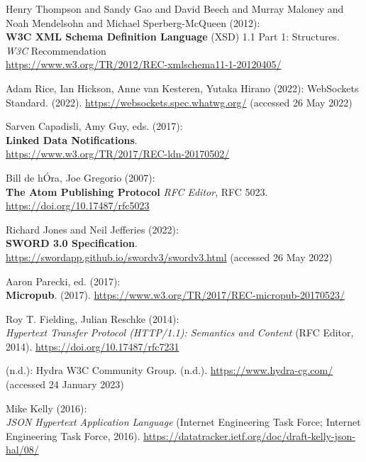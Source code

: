\begin{thebibliography}{9}
Henry Thompson and Sandy Gao and David Beech and Murray Maloney and Noah Mendelsohn and Michael Sperberg-McQueen (2012):\\
\textbf{W3C XML Schema Definition Language} ({XSD}) 1.1 {Part} 1: {Structures}. \\
\emph{W3C} Recommendation\\
\url{https://www.w3.org/TR/2012/REC-xmlschema11-1-20120405/}

Adam Rice, Ian Hickson, Anne van Kesteren, Yutaka Hirano (2022):
{WebSockets Standard}. (2022). \url{https://websockets.spec.whatwg.org/}
(accessed 26 May 2022)

Sarven Capadisli, Amy Guy, eds. (2017): \\
\textbf{Linked Data Notifications}.\\
\url{https://www.w3.org/TR/2017/REC-ldn-20170502/}

Bill de hÓra, Joe Gregorio (2007): \\
\textbf{The {Atom Publishing Protocol}} 
\emph{RFC Editor}, RFC 5023.
\url{https://doi.org/10.17487/rfc5023}

Richard Jones and Neil Jefferies (2022): \\
\textbf{SWORD 3.0 Specification}. \\
\url{https://swordapp.github.io/swordv3/swordv3.html} (accessed 26 May
2022)

Aaron Parecki, ed. (2017): \\
\textbf{Micropub}. (2017).
\url{https://www.w3.org/TR/2017/REC-micropub-20170523/}

Roy T. Fielding, Julian Reschke (2014): \\
\emph{Hypertext {Transfer Protocol} ({HTTP}/1.1): {Semantics} and {Content}} ({RFC Editor}, 2014).
\url{https://doi.org/10.17487/rfc7231}

(n.d.): Hydra {W3C Community Group}. (n.d.).
\url{https://www.hydra-cg.com/} (accessed 24 January 2023)

Mike Kelly (2016): \\
\emph{{JSON Hypertext Application Language}}
(Internet Engineering Task Force; Internet Engineering Task Force,
2016). \url{https://datatracker.ietf.org/doc/draft-kelly-json-hal/08/}


\end{thebibliography}
